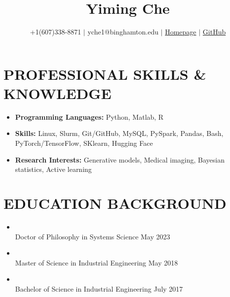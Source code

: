 \documentclass[10pt]{article}
\title{\bf  Yiming Che \vspace{-0.6em}}
\author{+1(607)338-8871 $\vert$ yche1@binghamton.edu $\vert$ \href{https://soloche.github.io}{Homepage} $\vert$ \href{https://github.com/SoloChe}{GitHub}}
\date{}
\begin{document}
	\maketitle

\vspace{-5em}
\section*{PROFESSIONAL SKILLS \& KNOWLEDGE}
\vspace{-0.5em}
 \begin{itemize}
	\setlength\itemsep{0.5pt}
 	\item {\bf Programming Languages:} Python, Matlab, R
 	\item {\bf Skills:} Linux, Slurm, Git/GitHub, MySQL, PySpark, Pandas, Bash, PyTorch/TensorFlow, SKlearn, Hugging Face
 	\item {\bf Research Interests:} Generative models, Medical imaging, Bayesian statistics, Active learning
 \end{itemize}

\vspace{-2em}
\section*{EDUCATION BACKGROUND}
\vspace{-0.5em}
\begin{itemize}
	\setlength\itemsep{0.5pt}

	\item {}                                                           
	\\Doctor of Philosophy in Systems Science \hfill May 2023 

	\item {}                                                           
	\\Master of Science in Industrial Engineering \hfill  May 2018

    \item {}
    \\Bachelor of Science in Industrial Engineering \hfill July 2017 
\end{itemize}
\end{document}
